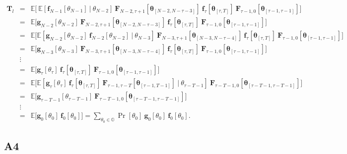 \documentclass[letterpaper,11pt]{article}
\begin{document}
\begin{eqnarray*}
	\mathbf{T}_l & = & \mathbb{E}\bigg[~   \mathbb{E}[\mathbf{f}_{N-1}[\theta_{N-1}] ~|~\theta_{N-2}]~
	\mathbf{F}_{N-2, \tau+1}[\bm{\theta}_{[N-2,N-\tau-3]}]~
	\mathbf{f}_{\tau}[\bm{\theta}_{[\tau,T]}] ~ 
	\mathbf{F}_{\tau-1, 0}[\bm{\theta}_{[\tau-1,\tau-1]}]
	\bigg] \\
	& = & 
	\mathbb{E}\bigg[\mathbf{g}_{N-2}[\theta_{N-2}]~  
	\mathbf{F}_{N-2, \tau+1}[\bm{\theta}_{[N-2,N-\tau-3]}]~
	\mathbf{f}_{\tau}[\bm{\theta}_{[\tau,T]}] ~ 
	\mathbf{F}_{\tau-1, 0}[\bm{\theta}_{[\tau-1,\tau-1]}] \bigg] \\
	& = & 
	\mathbb{E}\bigg[\mathbb{E}[\mathbf{g}_{N-2}[\theta_{N-2}] ~\mathbf{f}_{N-2}[\theta_{N-2}] ~ |~\theta_{N-3}]~   
	\mathbf{F}_{N-3, \tau+1}[\bm{\theta}_{[N-3,N-\tau-4]}]~
	\mathbf{f}_{\tau}[\bm{\theta}_{[\tau,T]}] ~ 
	\mathbf{F}_{\tau-1, 0}[\bm{\theta}_{[\tau-1,\tau-1]}] \bigg] \\
	&=&\mathbb{E}\bigg[\mathbf{g}_{N-3}[\theta_{N-3}]~  
	\mathbf{F}_{N-3, \tau+1}[\bm{\theta}_{[N-3,N-\tau-4]}]~
	\mathbf{f}_{\tau}[\bm{\theta}_{[\tau,T]}] ~ 
	\mathbf{F}_{\tau-1, 0}[\bm{\theta}_{[\tau-1,\tau-1]}]\bigg] \\
	& \vdots & \\
	& = & \mathbb{E}\bigg[\mathbf{g}_{\tau}[\theta_{\tau}]~  
	\mathbf{f}_{\tau}[\bm{\theta}_{[\tau,T]}] ~ 
	\mathbf{F}_{\tau-1, 0}[\bm{\theta}_{[\tau-1,\tau-1]}]\bigg] \\
	& = & \mathbb{E}\bigg[\mathbb{E}[\mathbf{g}_{\tau}[\theta_{\tau}] ~
	\mathbf{f}_{\tau}[\bm{\theta}_{[\tau,T]}] ~ 
	\mathbf{F}_{\tau-1, \tau-T}[\bm{\theta}_{[\tau-1,T-1]}]  ~|~\theta_{\tau-T-1}]~   
	\mathbf{F}_{\tau-T-1, 0}[\bm{\theta}_{[\tau-T-1,\tau-T-1]}] \bigg] \\
	&=& \mathbb{E}\bigg[\mathbf{g}_{\tau-T-1}[\theta_{\tau-T-1}]~  
	\mathbf{F}_{\tau-T-1, 0}[\bm{\theta}_{[\tau-T-1,\tau-T-1]}] \bigg] \\
	& \vdots & \\
	& = &  \mathbb{E}\bigg[\mathbf{g}_{0}[\theta_{0}]~  
	\mathbf{f}_0[\theta_0]\bigg] 
	= \sum_{\theta_0 \in \mathbb{O}}	\Pr[ \theta_0 ] ~ \mathbf{g}_0[\theta_0] ~\mathbf{f}_0[\theta_0].
\end{eqnarray*}

\vspace{0.1in}

\subsection*{A4}
\end{document}
